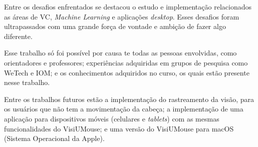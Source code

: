Entre os desafios enfrentados se destacou o estudo e implementação relacionados as áreas de VC, \textit{Machine Learning} e aplicações \textit{desktop}. Esses desafios foram ultrapassados com uma grande força de vontade e ambição de fazer algo diferente.

Esse trabalho só foi possível por causa te todas as pessoas envolvidas, como orientadores e professores; experiências adquiridas em grupos de pesquisa como WeTech e IOM; e os conhecimentos adquiridos no curso, os quais estão presente nesse trabalho.

Entre os trabalhos futuros estão a implementação do rastreamento da visão, para os usuários que não tem a movimentação da cabeça; a implementação de uma aplicação para dispositivos móveis (celulares e \textit{tablets}) com as mesmas funcionalidades do VisiUMouse; e uma versão do VisiUMouse para macOS (Sistema Operacional da Apple).

